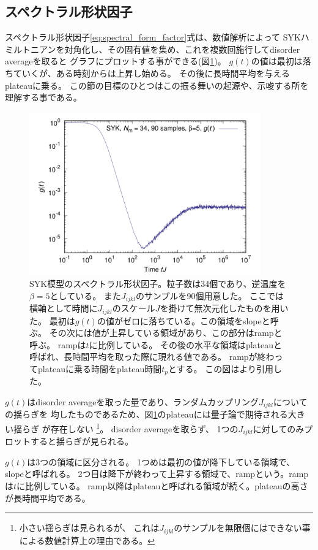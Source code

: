\subsection{スペクトラル形状因子}
スペクトラル形状因子\eqref{eq:spectral_form_factor}式は、数値解析によって
SYKハミルトニアンを対角化し、その固有値を集め、これを複数回施行してdisorder averageを取ると
グラフにプロットする事ができる(図\ref{fig:spectralformfactor})。
$g(t)$の値は最初は落ちていくが、ある時刻からは上昇し始める。
その後に長時間平均を与えるplateauに乗る。
この節の目標のひとつはこの振る舞いの起源や、示唆する所を理解する事である。
\begin{figure}[ht]
	\centering
	\includegraphics[width=10cm]{figures/spectralformfactor}
	\caption{SYK模型のスペクトラル形状因子。粒子数は34個であり、逆温度を$\beta = 5$としている。
		また$J_{ijkl}$のサンプルを90個用意した。
		ここでは横軸として時間に$J_{ijkl}$のスケール$J$を掛けて無次元化したものを用いた。
		最初は$g(t)$の値がゼロに落ちている。この領域をslopeと呼ぶ。
		その次には値が上昇している領域があり、この部分はrampと呼ぶ。
		rampは$t$に比例している。
		その後の水平な領域はplateauと呼ばれ、長時間平均を取った際に現れる値である。
		rampが終わってplateauに乗る時間をplateau時間$t_p$とする。
		この図は\cite{polchinski_chaos}より引用した。
	}
	\label{fig:spectralformfactor}
\end{figure}

$g(t)$はdisorder averageを取った量であり、ランダムカップリング$J_{ijkl}$についての揺らぎを
均したものであるため、図\ref{fig:spectralformfactor}のplateauには量子論で期待される大きい揺らぎ
が存在しない
\footnote{小さい揺らぎは見られるが、
	これは$J_{ijkl}$のサンプルを無限個にはできない事による数値計算上の理由である。}。
disorder averageを取らず、
1つの$J_{ijkl}$に対してのみプロットすると揺らぎが見られる\cite{polchinski_chaos}。

$g(t)$は3つの領域に区分される。
1つめは最初の値が降下している領域で、slopeと呼ばれる。
2つ目は降下が終わって上昇する領域で、rampという。rampは$t$に比例している。
ramp以降はplateauと呼ばれる領域が続く。plateauの高さが長時間平均である。

